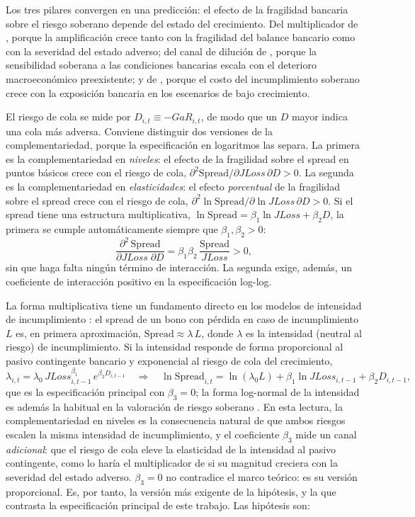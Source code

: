 Los tres pilares convergen en una predicción: el efecto de la fragilidad bancaria sobre el riesgo soberano depende del estado del crecimiento. Del multiplicador de \citet{FarhiTirole2018b}, porque la amplificación crece tanto con la fragilidad del balance bancario como con la severidad del estado adverso; del canal de dilución de \citet{AcharyaDrechslerSchnabl2014b}, porque la sensibilidad soberana a las condiciones bancarias escala con el deterioro macroeconómico preexistente; y de \citet{GennaioliMartinRossi2014}, porque el costo del incumplimiento soberano crece con la exposición bancaria en los escenarios de bajo crecimiento.

El riesgo de cola se mide por $D_{i,t}\equiv-GaR_{i,t}$, de modo que un $D$ mayor indica una cola más adversa. Conviene distinguir dos versiones de la complementariedad, porque la especificación en logaritmos las separa. La primera es la complementariedad en \emph{niveles}: el efecto de la fragilidad sobre el spread en puntos básicos crece con el riesgo de cola, $\partial^2\mathrm{Spread}/\partial JLoss\,\partial D>0$. La segunda es la complementariedad en \emph{elasticidades}: el efecto \emph{porcentual} de la fragilidad sobre el spread crece con el riesgo de cola, $\partial^2\ln\mathrm{Spread}/\partial\ln JLoss\,\partial D>0$. Si el spread tiene una estructura multiplicativa, $\ln\mathrm{Spread}=\beta_1\ln JLoss+\beta_2 D$, la primera se cumple automáticamente siempre que $\beta_1,\beta_2>0$:
\[
\frac{\partial^2\,\mathrm{Spread}}{\partial JLoss\;\partial D}=\beta_1\beta_2\,\frac{\mathrm{Spread}}{JLoss}>0,
\]
sin que haga falta ningún término de interacción. La segunda exige, además, un coeficiente de interacción positivo en la especificación log-log.

La forma multiplicativa tiene un fundamento directo en los modelos de intensidad de incumplimiento \citep{DuffieSingleton1999}: el spread de un bono con pérdida en caso de incumplimiento $L$ es, en primera aproximación, $\mathrm{Spread}\approx\lambda\,L$, donde $\lambda$ es la intensidad (neutral al riesgo) de incumplimiento. Si la intensidad responde de forma proporcional al pasivo contingente bancario y exponencial al riesgo de cola del crecimiento,
\[
\lambda_{i,t}=\lambda_0\,JLoss_{i,t-1}^{\beta_1}\,e^{\beta_2D_{i,t-1}}
\quad\Longrightarrow\quad
\ln\mathrm{Spread}_{i,t}=\ln(\lambda_0L)+\beta_1\ln JLoss_{i,t-1}+\beta_2D_{i,t-1},
\]
que es la especificación principal con $\beta_3=0$; la forma log-normal de la intensidad es además la habitual en la valoración de riesgo soberano \citep{PanSingleton2008}. En esta lectura, la complementariedad en niveles es la consecuencia natural de que ambos riesgos escalen la misma intensidad de incumplimiento, y el coeficiente $\beta_3$ mide un canal \emph{adicional}: que el riesgo de cola eleve la elasticidad de la intensidad al pasivo contingente, como lo haría el multiplicador de \citet{FarhiTirole2018b} si su magnitud creciera con la severidad del estado adverso. $\beta_3=0$ no contradice el marco teórico: es su versión proporcional. Es, por tanto, la versión más exigente de la hipótesis, y la que contrasta la especificación principal de este trabajo. Las hipótesis son:

